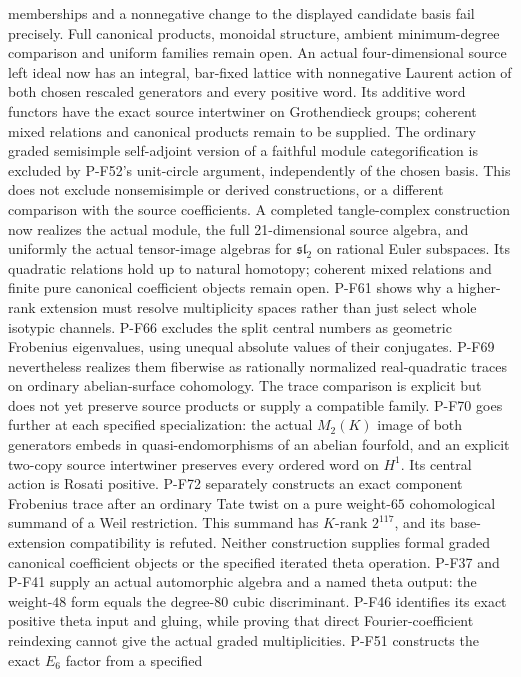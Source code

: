memberships and a nonnegative change to the displayed candidate
basis fail precisely. Full canonical products, monoidal structure,
ambient minimum-degree comparison and uniform families remain open.
An actual four-dimensional source left ideal now has an integral,
bar-fixed lattice with nonnegative Laurent action of both chosen
rescaled generators and every positive word. Its additive word
functors have the exact source intertwiner on Grothendieck groups;
coherent mixed relations and canonical products remain to be supplied.
The ordinary graded semisimple self-adjoint version of a
faithful module categorification is excluded by P-F52's
unit-circle argument, independently of the chosen basis.
This does not exclude nonsemisimple or derived constructions,
or a different comparison with the source coefficients.
A completed tangle-complex construction now realizes the actual
module, the full 21-dimensional source algebra, and uniformly the
actual tensor-image algebras for $\mathfrak{sl}_2$ on rational
Euler subspaces.  Its quadratic relations hold up to natural
homotopy; coherent mixed relations and finite pure canonical
coefficient objects remain open.  P-F61 shows why a higher-rank
extension must resolve multiplicity spaces rather than just select
whole isotypic channels.
P-F66 excludes the split central numbers as geometric Frobenius
eigenvalues, using unequal absolute values of their conjugates.
P-F69 nevertheless realizes them fiberwise as rationally normalized
real-quadratic traces on ordinary abelian-surface cohomology.
The trace comparison is explicit but does not yet preserve
source products or supply a compatible family.
P-F70 goes further at each specified specialization: the actual
$M_2(K)$ image of both generators embeds in quasi-endomorphisms
of an abelian fourfold, and an explicit two-copy source
intertwiner preserves every ordered word on $H^1$.
Its central action is Rosati positive.  P-F72 separately
constructs an exact component Frobenius trace after an ordinary
Tate twist on a pure weight-$65$ cohomological summand of a
Weil restriction.  This summand has $K$-rank $2^{117}$,
and its base-extension compatibility is refuted.  Neither
construction supplies formal graded canonical coefficient
objects or the specified iterated theta operation.
P-F37 and P-F41
supply an actual automorphic algebra and a named theta output:
the weight-$48$ form equals the degree-$80$ cubic discriminant.
P-F46 identifies its exact positive theta input and gluing,
while proving that direct Fourier-coefficient reindexing
cannot give the actual graded multiplicities.
P-F51 constructs the exact $E_6$ factor from a specified
